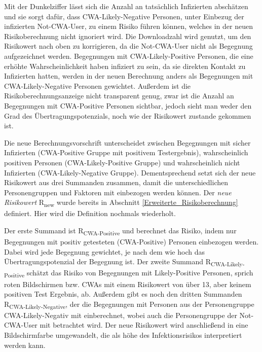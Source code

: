 \documentclass[conference,compsoc]{IEEEtran}
\begin{document}
Mit der Dunkelziffer lässt sich die Anzahl an tatsächlich Infizierten abschätzen und sie sorgt dafür, dass CWA-Likely-Negative Personen, unter Einbezug der infizierten Not-CWA-User, 
zu einem Risiko führen können, welches in der neuen Risikoberechnung nicht ignoriert wird.
Die Downloadzahl wird genutzt, um den Risikowert nach oben zu korrigieren, da die Not-CWA-User nicht als Begegnung aufgezeichnet werden.
Begegnungen mit CWA-Likely-Positive Personen, die eine erhöhte Wahrscheinlichkeit haben infiziert zu sein, da sie direkten Kontakt zu Infizierten hatten, 
werden in der neuen Berechnung anders als Begegnungen mit CWA-Likely-Negative Personen gewichtet.
Außerdem ist die Risikoberechnungsanzeige nicht transparent genug, zwar ist die Anzahl an Begegnungen mit CWA-Positive Personen sichtbar, 
jedoch sieht man weder den Grad des Übertragungspotenzials, noch wie der Risikowert zustande gekommen ist.

Die neue Berechnungsvorschrift unterscheidet zwischen 
Begegnungen mit sicher Infizierten (CWA-Positive Gruppe mit positivem Testergebnis),
wahrscheinlich positiven Personen (CWA-Likely-Positive Gruppe) und wahrscheinlich nicht Infizierten (CWA-Likely-Negative Gruppe). 
Dementsprechend setzt sich der neue Risikowert aus drei Summanden zusammen,
damit die unterschiedlichen Personengruppen und Faktoren mit einbezogen werden können.
Der \textit{neue Risikowert} R\textsubscript{new} wurde bereits in Abschnitt \ref{Erweiterte_Risikoberechnung} definiert.
Hier wird die Definition nochmals wiederholt.

\centerline{\text{ }}
\centerline{}
\centerline{}
\centerline{\text{ }}

Der erste Summand ist R\textsubscript{CWA-Positive} und berechnet das Risiko, indem nur Begegnungen mit positiv getesteten (CWA-Positive) Personen einbezogen werden. 
Dabei wird jede Begegnung gewichtet, je nach dem wie hoch das Übertragungspotenzial der Begegnung ist. 
Der zweite Summand R\textsubscript{CWA-Likely-Positive} schätzt das Risiko von Begegnungen mit Likely-Positive Personen, sprich roten Bildschirmen bzw. 
CWAs mit einem Risikowert von über 13, aber keinem positiven Test Ergebnis, ab.
Außerdem gibt es noch den dritten Summanden R\textsubscript{CWA-Likely-Negative}, der die Begegnungen mit Personen aus der Personengruppe CWA-Likely-Negativ mit einberechnet,
wobei auch die Personengruppe der Not-CWA-User mit betrachtet wird.
Der neue Risikowert wird anschließend in eine Bildschirmfarbe umgewandelt, die als höhe des Infektionsrisikos interpretiert werden kann.
\end{document}

